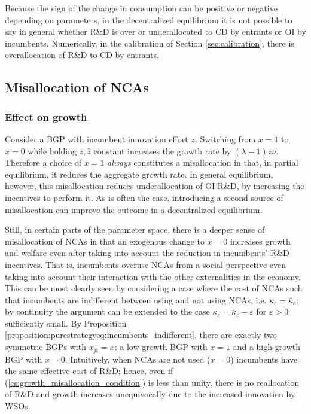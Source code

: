 \documentclass[11pt,english]{article}
\begin{document}
Because the sign of the change in consumption can be positive or negative depending on parameters, in the decentralized equilibrium it is not possible to say in general whether R\&D is over or underallocated to CD by entrants or OI by incumbents. Numerically, in the calibration of Section \ref{sec:calibration}, there is overallocation of R\&D to CD by entrants. 

\subsection{Misallocation of NCAs}\label{model:efficiency:misallocationNCAs}

\subsubsection{Effect on growth}

Consider a BGP with incumbent innovation effort $z$. Switching from $x = 1$ to $x = 0$ while holding $z,\hat{z}$ constant increases the growth rate by $(\lambda -1) z \nu$. Therefore a choice of $x = 1$ \textit{always} constitutes a misallocation in that, in partial equilibrium, it reduces the aggregate growth rate. In general equilibrium, however, this misallocation reduces underallocation of OI R\&D, by increasing the incentives to perform it. As is often the case, introducing a second source of misallocation can improve the outcome in a decentralized equilibrium.

Still, in certain parts of the parameter space, there is a deeper sense of misallocation of NCAs in that an exogenous change to $x = 0$ increases growth and welfare even after taking into account the reduction in incumbents' R\&D incentives. That is, incumbents overuse NCAs from a social perspective even taking into account their interaction with the other externalities in the economy. This can be most clearly seen by considering a case where the cost of NCAs such that incumbents are indifferent between using and not using NCAs, i.e. $\kappa_c = \bar{\kappa}_c$; by continuity the argument can be extended to the case $\kappa_c = \bar{\kappa}_c - \varepsilon$ for $\varepsilon > 0$ sufficiently small. By Proposition \ref{proposition:purestrategyeq:incumbents_indifferent}, there are exactly two symmetric BGPs with $x_{jt} = x$: a low-growth BGP with $x = 1$ and a high-growth BGP with $x = 0$. Intuitively, when NCAs are not used ($x = 0$) incumbents have the same effective cost of R\&D; hence, even if (\ref{cs:growth_misallocation_condition}) is less than unity, there is no reallocation of R\&D and growth increases unequivocally due to the increased innovation by WSOs. 
\end{document}
